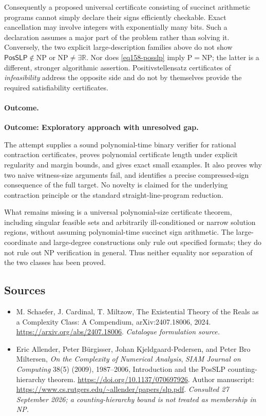 \documentclass[11pt,a4paper]{article}
\newcommand{\R}{\mathbb{R}}
\numberwithin{equation}{section}
\begin{document}
Consequently a proposed universal certificate consisting of succinct
arithmetic programs cannot simply declare their signs efficiently
checkable. Exact cancellation may involve integers with exponentially
many bits. Such a declaration assumes a major part of the problem rather
than solving it. Conversely, the two explicit large-description families
above do not show $\textsf{PosSLP}\notin\mathrm{NP}$ or
$\mathrm{NP}\ne\exists\R$. Nor does \eqref{eq158-posslp} imply
$\mathrm P=\mathrm{NP}$; the latter is a different, stronger algorithmic
assertion. Positivstellensatz certificates of \emph{infeasibility} address
the opposite side and do not by themselves provide the required
satisfiability certificates.

\paragraph{Outcome.}
\textbf{Outcome: Exploratory approach with unresolved gap.}

The attempt supplies a sound polynomial-time binary verifier for rational
contraction certificates, proves polynomial certificate length under
explicit regularity and margin bounds, and gives exact small examples.
It also proves why two naive witness-size arguments fail, and identifies
a precise compressed-sign consequence of the full target. No novelty is
claimed for the underlying contraction principle or the standard
straight-line-program reduction.

What remains missing is a universal polynomial-size certificate theorem,
including singular feasible sets and arbitrarily ill-conditioned or
narrow solution regions, without assuming polynomial-time succinct sign
arithmetic. The large-coordinate and large-degree constructions only rule
out specified formats; they do not rule out NP verification in general.
Thus neither equality nor separation of the two classes has been proved.
\subsection{Sources}
\begin{itemize}\raggedright
\item[\textnormal{[S1]}]\hypertarget{source:30006759:1}{} M. Schaefer, J. Cardinal, T. Miltzow, The Existential Theory of the Reals as a Complexity Class: A Compendium, arXiv:2407.18006, 2024.
\url{https://arxiv.org/abs/2407.18006}.
{\small\textit{Catalogue formulation source.}}
\item[\textnormal{[E1]}]\hypertarget{extra:30006759:1}{} Eric Allender, Peter
B\"urgisser, Johan Kjeldgaard-Pedersen, and Peter Bro Miltersen,
\emph{On the Complexity of Numerical Analysis}, \emph{SIAM Journal on
Computing} 38(5) (2009), 1987--2006, Introduction and the PosSLP
counting-hierarchy theorem.
\url{https://doi.org/10.1137/070697926}.
Author manuscript: \url{https://www.cs.rutgers.edu/~allender/papers/slp.pdf}.
{\small\textit{Consulted 27 September 2026; a counting-hierarchy bound is
not treated as membership in NP.}}
\end{itemize}
\end{document}
